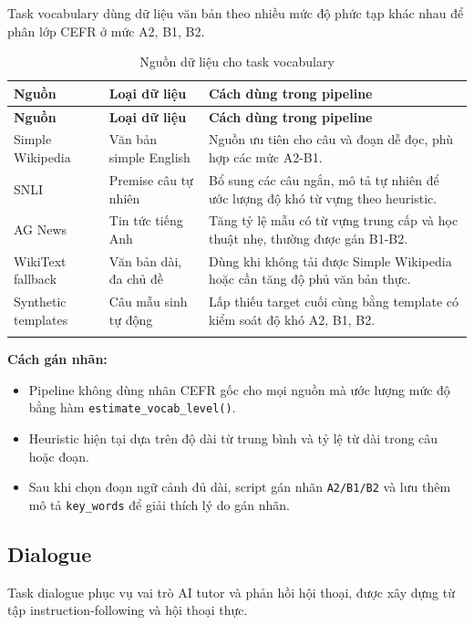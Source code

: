 \documentclass[12pt,a4paper]{article}
\begin{document}
Task vocabulary dùng dữ liệu văn bản theo nhiều mức độ phức tạp khác nhau để phân lớp CEFR ở mức A2, B1, B2.

\begin{longtable}{p{3.4cm}p{4.1cm}p{7cm}}
\toprule
\textbf{Nguồn} & \textbf{Loại dữ liệu} & \textbf{Cách dùng trong pipeline} \\
\midrule
\endfirsthead
\toprule
\textbf{Nguồn} & \textbf{Loại dữ liệu} & \textbf{Cách dùng trong pipeline} \\
\midrule
\endhead
Simple Wikipedia & Văn bản simple English & Nguồn ưu tiên cho câu và đoạn dễ đọc, phù hợp các mức A2-B1. \\
SNLI & Premise câu tự nhiên & Bổ sung các câu ngắn, mô tả tự nhiên để ước lượng độ khó từ vựng theo heuristic. \\
AG News & Tin tức tiếng Anh & Tăng tỷ lệ mẫu có từ vựng trung cấp và học thuật nhẹ, thường được gán B1-B2. \\
WikiText fallback & Văn bản dài, đa chủ đề & Dùng khi không tải được Simple Wikipedia hoặc cần tăng độ phủ văn bản thực. \\
Synthetic templates & Câu mẫu sinh tự động & Lấp thiếu target cuối cùng bằng template có kiểm soát độ khó A2, B1, B2. \\
\bottomrule
\caption{Nguồn dữ liệu cho task vocabulary}
\end{longtable}

\textbf{Cách gán nhãn:}
\begin{itemize}[leftmargin=1.2cm]
    \item Pipeline không dùng nhãn CEFR gốc cho mọi nguồn mà ước lượng mức độ bằng hàm \texttt{estimate\_vocab\_level()}.
    \item Heuristic hiện tại dựa trên độ dài từ trung bình và tỷ lệ từ dài trong câu hoặc đoạn.
    \item Sau khi chọn đoạn ngữ cảnh đủ dài, script gán nhãn \texttt{A2/B1/B2} và lưu thêm mô tả \texttt{key\_words} để giải thích lý do gán nhãn.
\end{itemize}

\subsection{Dialogue}

Task dialogue phục vụ vai trò AI tutor và phản hồi hội thoại, được xây dựng từ tập instruction-following và hội thoại thực.
\end{document}
